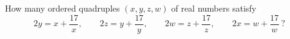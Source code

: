 How many ordered quadruples $(x,y,z,w)$ of real numbers satisfy
\[
2y=x+\dfrac{17}{x},\qquad 2z=y+\dfrac{17}{y},\qquad 2w=z+\dfrac{17}{z},\qquad 2x=w+\dfrac{17}{w}\ ?
\]

